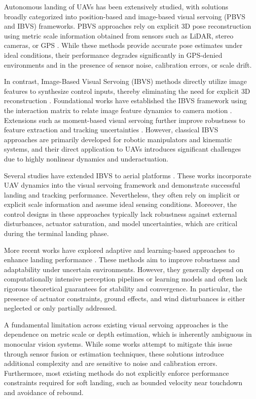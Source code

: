 \documentclass{IEEEtaes}
\begin{document}
Autonomous landing of UAVs has been extensively studied, with solutions broadly categorized into position-based and image-based visual servoing (PBVS and IBVS) frameworks. PBVS approaches rely on explicit 3D pose reconstruction using metric scale information obtained from sensors such as LiDAR, stereo cameras, or GPS \cite{salehi2021, cho2022}. While these methods provide accurate pose estimates under ideal conditions, their performance degrades significantly in GPS-denied environments and in the presence of sensor noise, calibration errors, or scale drift.

In contrast, Image-Based Visual Servoing (IBVS) methods directly utilize image features to synthesize control inputs, thereby eliminating the need for explicit 3D reconstruction \cite{chaumette2004, chaumette2006}. Foundational works have established the IBVS framework using the interaction matrix to relate image feature dynamics to camera motion \cite{chaumette2004}. Extensions such as moment-based visual servoing further improve robustness to feature extraction and tracking uncertainties \cite{tahri2005}. However, classical IBVS approaches are primarily developed for robotic manipulators and kinematic systems, and their direct application to UAVs introduces significant challenges due to highly nonlinear dynamics and underactuation.

Several studies have extended IBVS to aerial platforms \cite{jabbari2014, xie2016_2, xie2016, xie2016_1}. These works incorporate UAV dynamics into the visual servoing framework and demonstrate successful landing and tracking performance. Nevertheless, they often rely on implicit or explicit scale information and assume ideal sensing conditions. Moreover, the control designs in these approaches typically lack robustness against external disturbances, actuator saturation, and model uncertainties, which are critical during the terminal landing phase.

More recent works have explored adaptive and learning-based approaches to enhance landing performance \cite{chen2025, bouazza2025, kamath2026, zhang2026}. These methods aim to improve robustness and adaptability under uncertain environments. However, they generally depend on computationally intensive perception pipelines or learning models and often lack rigorous theoretical guarantees for stability and convergence. In particular, the presence of actuator constraints, ground effects, and wind disturbances is either neglected or only partially addressed.

A fundamental limitation across existing visual servoing approaches is the dependence on metric scale or depth estimation, which is inherently ambiguous in monocular vision systems. While some works attempt to mitigate this issue through sensor fusion or estimation techniques, these solutions introduce additional complexity and are sensitive to noise and calibration errors. Furthermore, most existing methods do not explicitly enforce performance constraints required for soft landing, such as bounded velocity near touchdown and avoidance of rebound.
\end{document}
